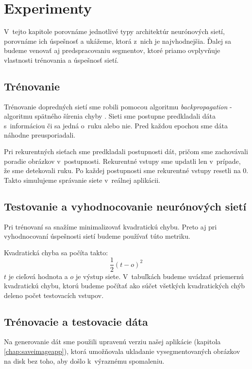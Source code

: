 \chapter{Experimenty}\label{chap:experiments}

V~tejto kapitole porovnáme jednotlivé typy architektúr neurónových sietí, porovnáme ich úspešnosť a ukážeme, ktorá z~nich je najvhodnejšia. Ďalej sa budeme venovať aj predspracovaniu segmentov, ktoré priamo ovplyvňuje vlastnosti trénovania a úspešnosť sietí.
\bigskip

\section{Trénovanie}

Trénovanie dopredných sietí sme robili pomocou algoritmu \textit{backpropagation} - algoritmu spätného šírenia chyby \cite{haykin1999neural}. Sieti sme postupne predkladali dáta s~informáciou či sa jedná o~ruku alebo nie. Pred každou epochou sme dáta náhodne preusporiadali. 

Pri rekurentných sieťach sme predkladali postupnosti dát, pričom sme zachovávali poradie obrázkov v~postupnosti. Rekurentné vstupy sme updatli len v~prípade, že sme detekovali ruku. Po každej postupnosti sme rekurentné vstupy resetli na 0. Takto simulujeme správanie siete v~reálnej aplikácii.

\section{Testovanie a vyhodnocovanie neurónových sietí}
Pri trénovaní sa snažíme minimalizovať kvadratickú chybu. Preto aj pri vyhodnocovaní úspešnosti sietí budeme používať túto metriku.

Kvadratická chyba sa počíta takto: $$\frac{1}{2}(t-o)^2$$
$t$ je cieľová hodnota a $o$ je výstup siete. V~tabuľkách budeme uvádzať priemernú kvadratickú chybu, ktorú budeme počítať ako súčet všetkých kvadratických chýb deleno počet testovacích vstupov. 

\section{Trénovacie a testovacie dáta}

Na generovanie dát sme použili upravenú verziu našej aplikácie (kapitola \ref{chap:saveimageapp}), ktorá umožňovala ukladanie vysegmentovaných obrázkov na disk bez toho, aby došlo k~výraznému spomaleniu. 


